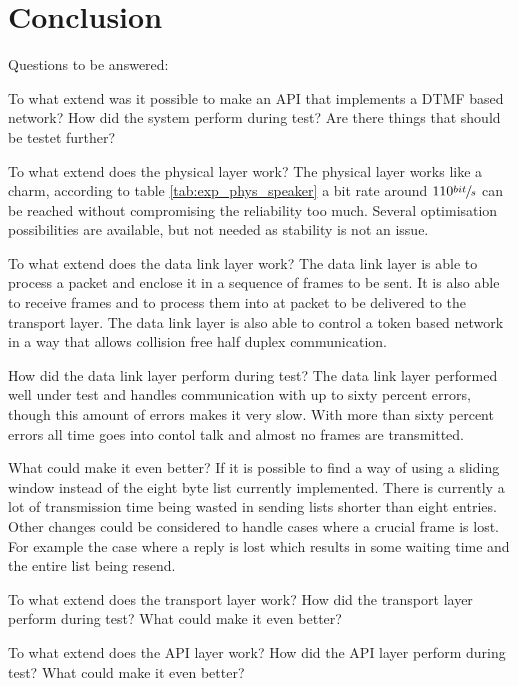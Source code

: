 \chapter{Conclusion}\label{chap:conclusion}
Questions to be answered:

To what extend was it possible to make an API that implements a DTMF based
network?
How did the system perform during test? 
Are there things that should be testet further?

To what extend does the physical layer work? 
The physical layer works like a charm, according to table \ref{tab:exp_phys_speaker} a bit rate around $110\sfrac{bit}{s}$ can be reached without compromising the reliability too much. Several optimisation possibilities are available, but not needed as stability is not an issue.

  To what extend does the data link layer work? 
The data link layer is able to process a packet and enclose it in a sequence of
frames to be sent. It is also able to receive frames and to process them into at
packet to be delivered to the transport layer. The data link layer is also able
to control a token based network in a way that allows collision free half duplex
communication. 

  How did the data link layer perform during test? The data link
layer performed well under test and handles communication with up to sixty
percent errors, though this amount of errors makes it very slow. With more than
sixty percent errors all time goes into contol talk and almost no frames are
transmitted.

  What could make it even better?
If it is possible to find a way of using a sliding window instead of the eight
byte list currently implemented. There is currently a lot of transmission time
being wasted in sending lists shorter than eight entries. Other changes could be
considered to handle cases where a crucial frame is lost. For example the case
where a reply is lost which results in some waiting time and the entire list
being resend.

To what extend does the transport layer work? 
How did the transport layer perform during test?
What could make it even better?

To what extend does the API layer work? 
How did the API layer perform during test?
What could make it even better?

